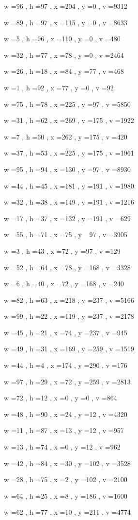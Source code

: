 \documentclass[11pt]{article}
\begin{document}
w =96 , h =97 , x =204 , y =0 , v =9312
\par
w =89 , h =97 , x =115 , y =0 , v =8633
\par
w =5 , h =96 , x =110 , y =0 , v =480
\par
w =32 , h =77 , x =78 , y =0 , v =2464
\par
w =26 , h =18 , x =84 , y =77 , v =468
\par
w =1 , h =92 , x =77 , y =0 , v =92
\par
w =75 , h =78 , x =225 , y =97 , v =5850
\par
w =31 , h =62 , x =269 , y =175 , v =1922
\par
w =7 , h =60 , x =262 , y =175 , v =420
\par
w =37 , h =53 , x =225 , y =175 , v =1961
\par
w =95 , h =94 , x =130 , y =97 , v =8930
\par
w =44 , h =45 , x =181 , y =191 , v =1980
\par
w =32 , h =38 , x =149 , y =191 , v =1216
\par
w =17 , h =37 , x =132 , y =191 , v =629
\par
w =55 , h =71 , x =75 , y =97 , v =3905
\par
w =3 , h =43 , x =72 , y =97 , v =129
\par
w =52 , h =64 , x =78 , y =168 , v =3328
\par
w =6 , h =40 , x =72 , y =168 , v =240
\par
w =82 , h =63 , x =218 , y =237 , v =5166
\par
w =99 , h =22 , x =119 , y =237 , v =2178
\par
w =45 , h =21 , x =74 , y =237 , v =945
\par
w =49 , h =31 , x =169 , y =259 , v =1519
\par
w =44 , h =4 , x =174 , y =290 , v =176
\par
w =97 , h =29 , x =72 , y =259 , v =2813
\par
w =72 , h =12 , x =0 , y =0 , v =864
\par
w =48 , h =90 , x =24 , y =12 , v =4320
\par
w =11 , h =87 , x =13 , y =12 , v =957
\par
w =13 , h =74 , x =0 , y =12 , v =962
\par
w =42 , h =84 , x =30 , y =102 , v =3528
\par
w =28 , h =75 , x =2 , y =102 , v =2100
\par
w =64 , h =25 , x =8 , y =186 , v =1600
\par
w =62 , h =77 , x =10 , y =211 , v =4774
\par
\newpage
\end{document}

